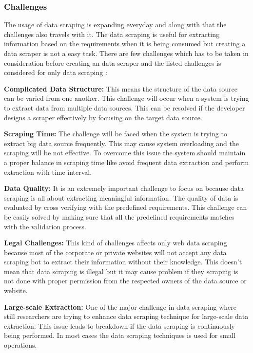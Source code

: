 \subsubsection{Challenges}
%
%
The usage of data scraping is expanding everyday and along with that the challenges also travels with it. The data scraping is useful for extracting information based on the requirements when it is being consumed but creating a data scraper is not a easy task. There are few challenges which has to be taken in consideration before creating an data scraper and the listed challenges is considered for only data scraping \cite{And2021}\cite{Mic2020}:

{\bf Complicated Data Structure:} This means the structure of the data source can be varied from one another. This challenge will occur when a system is trying to extract data from multiple data sources. This can be resolved if the developer designs a scraper effectively by focusing on the target data source.

{\bf Scraping Time:} The challenge will be faced when the system is trying to extract big data source frequently. This may cause system overloading and the scraping will be not effective. To overcome this issue the system should maintain a proper balance in scraping time like avoid frequent data extraction and perform extraction with time interval.

{\bf Data Quality:} It is an extremely important challenge to focus on because data scraping is all about extracting meaningful information. The quality of data is evaluated by cross verifying with the predefined requirements. This challenge can be easily solved by making sure that all the predefined requirements matches with the validation process.

{\bf Legal Challenges:} This kind of challenges affects only web data scraping because most of the corporate or private websites will not accept any data scraping bot to extract their information without their knowledge. This doesn't mean that data scraping is illegal but it may cause problem if they scraping is not done with proper permission from the respected owners of the data source or website.

{\bf Large-scale Extraction:} One of the major challenge in data scraping where still researchers are trying to enhance data scraping technique for large-scale data extraction. This issue leads to breakdown if the data scraping is continuously being performed. In most cases the data scraping techniques is used for small operations.
 
